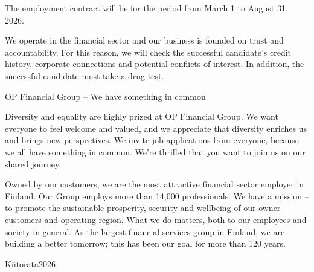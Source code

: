 \documentclass[a4paper,11pt]{article}
\begin{document}
The employment contract will be for the period from March 1 to August 31, 2026.

We operate in the financial sector and our business is founded on trust and accountability. For this reason, we will check the successful candidate's credit history, corporate connections and potential conflicts of interest. In addition, the successful candidate must take a drug test.

OP Financial Group – We have something in common

Diversity and equality are highly prized at OP Financial Group. We want everyone to feel welcome and valued, and we appreciate that diversity enriches us and brings new perspectives. We invite job applications from everyone, because we all have something in common. We’re thrilled that you want to join us on our shared journey.

Owned by our customers, we are the most attractive financial sector employer in Finland. Our Group employs more than 14,000 professionals. We have a mission – to promote the sustainable prosperity, security and wellbeing of our owner-customers and operating region. What we do matters, both to our employees and society in general. As the largest financial services group in Finland, we are building a better tomorrow; this has been our goal for more than 120 years.

Kiitorata2026
\end{document}
